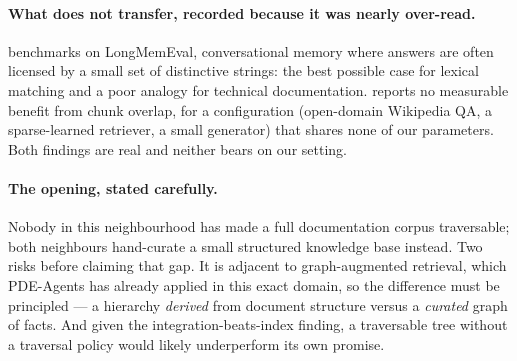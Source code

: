 \paragraph{What does not transfer, recorded because it was nearly over-read.}
\cite{grepallyouneed2026} benchmarks on LongMemEval, conversational memory
where answers are often licensed by a small set of distinctive strings: the
best possible case for lexical matching and a poor analogy for technical
documentation. \cite{chunking2026} reports no measurable benefit from chunk
overlap, for a configuration (open-domain Wikipedia QA, a sparse-learned
retriever, a small generator) that shares none of our parameters. Both findings
are real and neither bears on our setting.

\paragraph{The opening, stated carefully.}
Nobody in this neighbourhood has made a full documentation corpus traversable;
both neighbours hand-curate a small structured knowledge base instead. Two
risks before claiming that gap. It is adjacent to graph-augmented retrieval,
which PDE-Agents has already applied in this exact domain, so the difference
must be principled --- a hierarchy \emph{derived} from document structure
versus a \emph{curated} graph of facts. And given the integration-beats-index
finding, a traversable tree without a traversal policy would likely
underperform its own promise.
